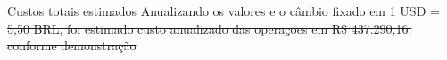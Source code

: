 \documentclass[
    12pt,               %
    openright,          %
    oneside,
    a4paper,            %
    BIBLATEX,           %
    TODO,               %
    english,            %
    brazil              %
    ]{ifsp-spo-inf-ctds}
\providecommand{\DIFdel}[1]{{\protect\color{red}\sout{#1}}}                      %
\providecommand{\DIFdelbegin}{} %
\providecommand{\DIFdelend}{} %
\newcommand{\DIFscaledelfig}{0.5}
\newlength{\DIFdelgraphicswidth} %
\newlength{\DIFdelgraphicsheight} %
\newcommand{\DIFdelincludegraphics}[2][]{%
\sbox{\DIFdelgraphicsbox}{\DIFOincludegraphics[#1]{#2}}%
\settoboxwidth{\DIFdelgraphicswidth}{\DIFdelgraphicsbox} %
\settoboxtotalheight{\DIFdelgraphicsheight}{\DIFdelgraphicsbox} %
\scalebox{\DIFscaledelfig}{%
\parbox[b]{\DIFdelgraphicswidth}{\usebox{\DIFdelgraphicsbox}\\[-\baselineskip] \rule{\DIFdelgraphicswidth}{0em}}\llap{\resizebox{\DIFdelgraphicswidth}{\DIFdelgraphicsheight}{%
\setlength{\unitlength}{\DIFdelgraphicswidth}%
\begin{picture}(1,1)%
\thicklines\linethickness{2pt} %
{\color[rgb]{1,0,0}\put(0,0){\framebox(1,1){}}}%
{\color[rgb]{1,0,0}\put(0,0){\line( 1,1){1}}}%
{\color[rgb]{1,0,0}\put(0,1){\line(1,-1){1}}}%
\end{picture}%
}\hspace*{3pt}}} %
} %
\DeclareRobustCommand{\DIFdelbegin}{\DIFOdelbegin \let\includegraphics\DIFdelincludegraphics} %
\DeclareRobustCommand{\DIFdelend}{\DIFOaddend \let\includegraphics\DIFOincludegraphics} %
\begin{document}
        \DIFdelbegin %
\DIFdel{Custos totais estimados}%
\DIFdel{Anualizando os valores e o câmbio fixado em 1 USD = 5,50 BRL, foi estimado custo anualizado das operações em R\$ 437.290,16, conforme demonstração}\DIFdelend %
\end{document}
